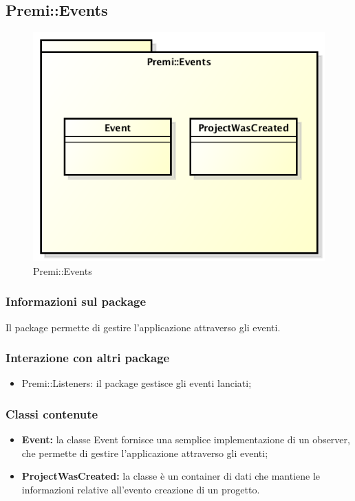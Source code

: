 \subsection{Premi::Events}
\begin{figure}[h]
	\centering
	\includegraphics[width=0.7\linewidth]{img/premi_events}
	\caption[Premi::Events]{Premi::Events}
	\label{fig:premi_events}
\end{figure}

\subsubsection*{Informazioni sul package}
Il package permette di gestire l'applicazione attraverso gli eventi.

\subsubsection*{Interazione con altri package}
\begin{itemize}
	\item Premi::Listeners: il package gestisce gli eventi lanciati;
\end{itemize}

\subsubsection*{Classi contenute}
\begin{itemize}
	\item \textbf{Event: }la classe Event fornisce una semplice implementazione di un observer, che permette di gestire l'applicazione attraverso gli eventi;
	\item \textbf{ProjectWasCreated: }la classe è un container di dati che mantiene le informazioni relative all'evento creazione di un progetto.
\end{itemize}

